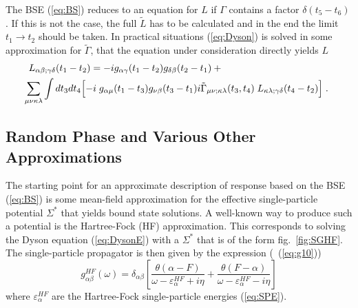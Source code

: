 The BSE (\ref{eq:BS}) reduces to an equation for $L$ if $\Gamma$ contains a 
factor
$\delta(t_5-t_6)$. If this is not the case, the full $\tilde{L}$ has to be
calculated and in the end the limit $t_1 \rightarrow t_2$ should be taken.
In practical situations\cite{BAD90} (\ref{eq:Dyson}) is solved
in some approximation for $\tilde{\Gamma}$, that the equation 
under consideration directly yields $L$
%
	\begin{eqnarray}
	\lefteqn{
		L_{\alpha\beta;\gamma\delta}(t_1-t_2)
	=
		-ig_{\alpha\gamma}(t_1-t_2)g_{\delta\beta}(t_2-t_1) 
	+
	\mbox{ }
	}
	\label{eq:BSap} \\
	&&
	\hspace{-0.5cm}
		\sum_{\mu\nu\kappa\lambda}
		\int dt_3dt_4%
		\Bigl[
		-i\;g_{\alpha\mu}(t_1-t_3)g_{\nu\beta}(t_3-t_1)
		i\tilde{\Gamma}_{\mu\nu;\kappa\lambda}(t_3,t_4)
		\;L_{\kappa\lambda;\gamma\delta}(t_4-t_2)
		\Bigr] 
	\nonumber
	\;.
	\end{eqnarray}
%
%
\subsection{Random Phase and Various Other Approximations}
The starting point for an approximate description of response based on the 
BSE (\ref{eq:BS}) is
some mean-field approximation for the effective single-particle potential
$\Sigma^\ast$ that yields bound state solutions. A well-known way to produce 
such a potential is the Hartree-Fock (HF) approximation\cite{RS80}. This 
corresponds
to solving the Dyson equation (\ref{eq:DysonE}) with a $\Sigma^\ast$ that is 
of the form fig.~\ref{fig:SGHF}. The single-particle propagator is then given 
by the expression (\cf\ (\ref{eq:g10}))
%
	\begin{equation}
		g^{HF}_{\alpha\beta}(\omega) 
	=
		\delta_{\alpha\beta}
		\left[
			\frac{\theta(\alpha-F)}
			{\omega - \varepsilon^{HF}_\alpha + i \eta}
	+
			\frac{\theta(F-\alpha)}
			{\omega - \varepsilon^{HF}_\alpha - i \eta}
		\right]
	\label{eq:gHF}
	\end{equation}
%
where $\varepsilon^{HF}_\alpha$ are the Hartree-Fock single-particle 
energies (\ref{eq:SPE}).

